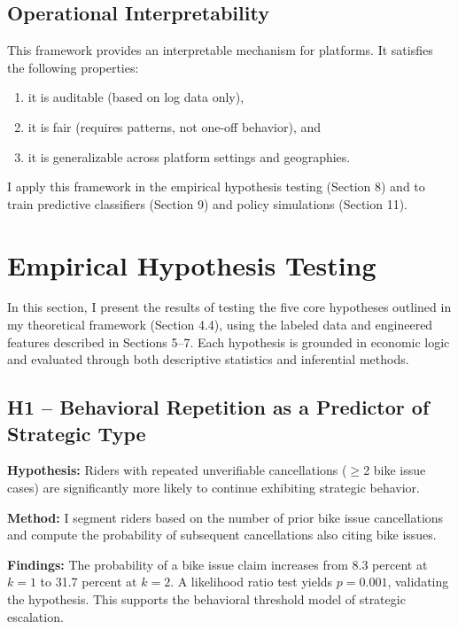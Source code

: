 \subsection{Operational Interpretability}

This framework provides an interpretable mechanism for platforms. It satisfies the following properties:

\begin{enumerate}
    \item it is auditable (based on log data only),
    \item it is fair (requires patterns, not one-off behavior), and
    \item it is generalizable across platform settings and geographies.
\end{enumerate}

I apply this framework in the empirical hypothesis testing (Section 8) and to train predictive classifiers (Section 9) and policy simulations (Section 11).

\section{Empirical Hypothesis Testing}

In this section, I present the results of testing the five core hypotheses outlined in my theoretical framework (Section 4.4), using the labeled data and engineered features described in Sections 5--7. Each hypothesis is grounded in economic logic and evaluated through both descriptive statistics and inferential methods.

\subsection{H1 -- Behavioral Repetition as a Predictor of Strategic Type}

\textbf{Hypothesis:} Riders with repeated unverifiable cancellations ($\geq$2 bike issue cases) are significantly more likely to continue exhibiting strategic behavior.

\textbf{Method:} I segment riders based on the number of prior bike issue cancellations and compute the probability of subsequent cancellations also citing bike issues.

\textbf{Findings:} The probability of a bike issue claim increases from 8.3 percent at $k=1$ to 31.7 percent at $k=2$.  
A likelihood ratio test yields $p = 0.001$, validating the hypothesis. This supports the behavioral threshold model of strategic escalation.

